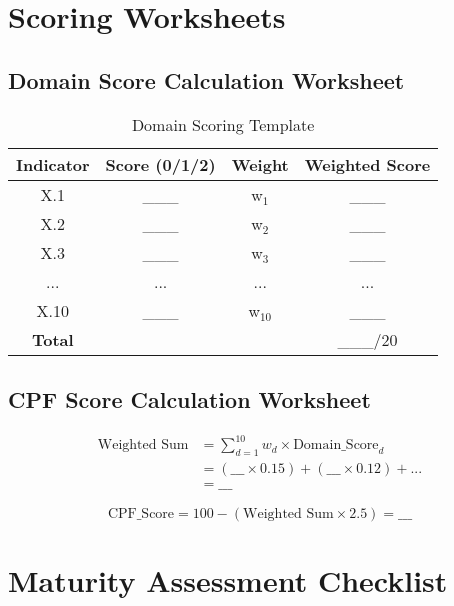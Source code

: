 \documentclass[11pt,a4paper]{article}
\begin{document}

\appendix

\section{Scoring Worksheets}

\subsection{Domain Score Calculation Worksheet}

\begin{table}[h]
\centering
\caption{Domain Scoring Template}
\small
\begin{tabular}{cccc}
\toprule
\textbf{Indicator} & \textbf{Score (0/1/2)} & \textbf{Weight} & \textbf{Weighted Score} \\
\midrule
X.1 & \_\_\_ & w$_1$ & \_\_\_ \\
X.2 & \_\_\_ & w$_2$ & \_\_\_ \\
X.3 & \_\_\_ & w$_3$ & \_\_\_ \\
... & ... & ... & ... \\
X.10 & \_\_\_ & w$_{10}$ & \_\_\_ \\
\midrule
\textbf{Total} & & & \_\_\_/20 \\
\bottomrule
\end{tabular}
\end{table}

\subsection{CPF Score Calculation Worksheet}

\begin{align*}
\text{Weighted Sum} &= \sum_{d=1}^{10} w_d \times \text{Domain\_Score}_d \\
&= (\_\_\_ \times 0.15) + (\_\_\_ \times 0.12) + ... \\
&= \_\_\_
\end{align*}

\begin{equation*}
\text{CPF\_Score} = 100 - (\text{Weighted Sum} \times 2.5) = \_\_\_
\end{equation*}

\section{Maturity Assessment Checklist}
\end{document}
